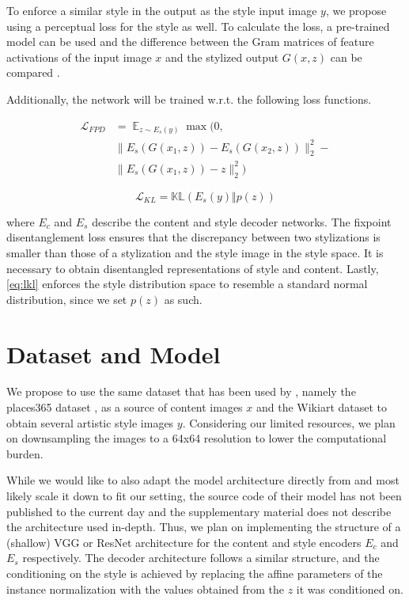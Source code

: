 \documentclass[twoside,twocolumn]{article}
\begin{document}
To enforce a similar style in the output as the style input image $y$, we propose using a perceptual loss for the style as well. To calculate the loss, a pre-trained model can be used and the difference between the Gram matrices of feature activations of the input image $x$ and the stylized output $G(x, z)$ can be compared \cite{johnson}.

Additionally, the network will be trained w.r.t. the following loss functions.

\begin{equation}
\begin{split}
\mathcal{L}_{FPD} & = \mathop{\mathbb{E}}_{z \sim E_s(y)} \max(0, \\ & 
\lVert E_s(G(x_1, z)) - E_s(G(x_2, z))\rVert^2_2 - \\ &
\lVert E_s(G(x_1, z)) - z \rVert^2_2)
\end{split}
\label{eq:lfdp}
\end{equation}

\begin{equation}
\mathcal{L}_{KL} = \mathbb{KL}(E_s(y) \Vert p(z))
\label{eq:lkl}
\end{equation}

where $E_c$ and $E_s$ describe the content and style decoder networks. The fixpoint disentanglement loss ensures that the discrepancy between two stylizations is smaller than those of a stylization and the style image in the style space. It is necessary to obtain disentangled representations of style and content. Lastly, \eqref{eq:lkl} enforces the style distribution space to resemble a standard normal distribution, since we set $p(z)$ as such.

\section{Dataset and Model}

We propose to use the same dataset that has been used by \cite{Kotovenko_2019_ICCV}, namely the places365 dataset \cite{places365}, as a source of content images $x$ and the Wikiart dataset \cite{wikiart} to obtain several artistic style images $y$. Considering our limited resources, we plan on downsampling the images to a 64x64 resolution to lower the computational burden.

While we would like to also adapt the model architecture directly from \cite{Kotovenko_2019_ICCV} and most likely scale it down to fit our setting, the source code of their model has not been published to the current day and the supplementary material does not describe the architecture used in-depth. Thus, we plan on implementing the structure of a (shallow) VGG or ResNet architecture for the content and style encoders $E_c$ and $E_s$ respectively. The decoder architecture follows a similar structure, and the conditioning on the style is achieved by replacing the affine parameters of the instance normalization with the values obtained from the $z$ it was conditioned on.
\end{document}
